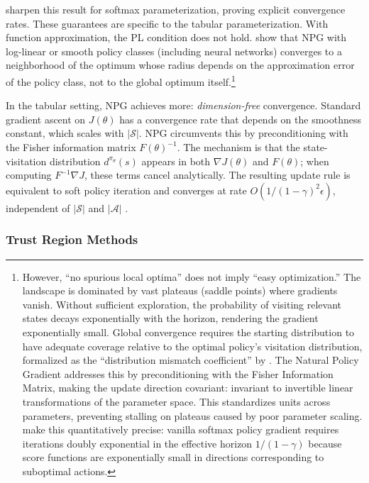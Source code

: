 \citet{mei2020} sharpen this result for softmax parameterization, proving explicit convergence rates. These guarantees are specific to the tabular parameterization. With function approximation, the PL condition does not hold. \citet[Theorem~6.2]{agarwal2021theory} show that NPG with log-linear or smooth policy classes (including neural networks) converges to a neighborhood of the optimum whose radius depends on the approximation error of the policy class, not to the global optimum itself.\footnote{However, ``no spurious local optima'' does not imply ``easy optimization.'' The landscape is dominated by vast plateaus (saddle points) where gradients vanish. Without sufficient exploration, the probability of visiting relevant states decays exponentially with the horizon, rendering the gradient exponentially small. Global convergence requires the starting distribution to have adequate coverage relative to the optimal policy's visitation distribution, formalized as the ``distribution mismatch coefficient'' by \citet{agarwal2021theory}. The Natural Policy Gradient addresses this by preconditioning with the Fisher Information Matrix, making the update direction covariant: invariant to invertible linear transformations of the parameter space. This standardizes units across parameters, preventing stalling on plateaus caused by poor parameter scaling. \citet{li2022softmax} make this quantitatively precise: vanilla softmax policy gradient requires iterations doubly exponential in the effective horizon $1/(1-\gamma)$ because score functions are exponentially small in directions corresponding to suboptimal actions.}

In the tabular setting, NPG achieves more: \emph{dimension-free} convergence. Standard gradient ascent on $J(\theta)$ has a convergence rate that depends on the smoothness constant, which scales with $|\mathcal{S}|$. NPG circumvents this by preconditioning with the Fisher information matrix $F(\theta)^{-1}$. The mechanism is that the state-visitation distribution $d^{\pi_\theta}(s)$ appears in both $\nabla J(\theta)$ and $F(\theta)$; when computing $F^{-1} \nabla J$, these terms cancel analytically. The resulting update rule is equivalent to soft policy iteration and converges at rate $O(1/(1-\gamma)^2 \epsilon)$, independent of $|\mathcal{S}|$ and $|\mathcal{A}|$ \citep{xiao2022convergence}.

\subsubsection{Trust Region Methods}


